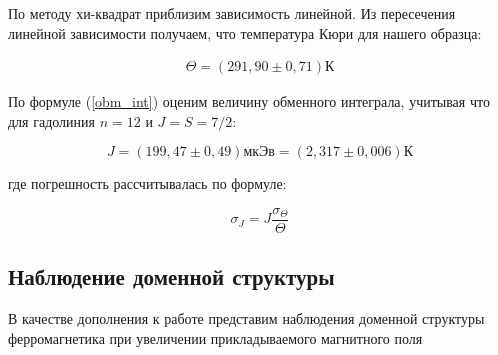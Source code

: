 \documentclass[a4paper,12pt]{article}
\begin{document}
По методу хи-квадрат приблизим зависимость линейной. Из пересечения линейной зависимости получаем, что температура Кюри для нашего образца:

\begin{align*}
	\Theta = (291,90 \pm 0,71) К 
\end{align*}

По формуле (\ref{obm_int}) оценим величину обменного интеграла, учитывая что для гадолиния $n = 12$ и $J = S = 7/2$:

$$
	J = (199,47 \pm 0,49) мкЭв = (2,317 \pm 0,006) К
$$

где погрешность рассчитывалась по формуле:

$$
	\sigma_J = J \frac{\sigma_{\Theta}}{\Theta}
$$

\newpage

\subsection*{Наблюдение доменной структуры}

В качестве дополнения к работе представим наблюдения доменной структуры ферромагнетика при увеличении прикладываемого магнитного поля	
\end{document}
